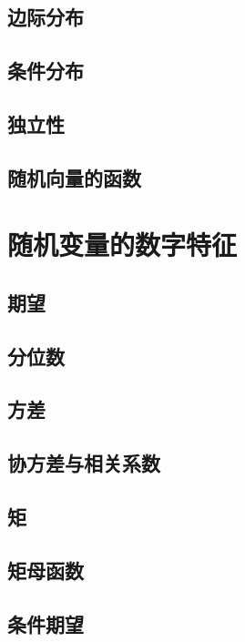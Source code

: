 \documentclass[zihao=-4,linespread=1.5,a4paper,heading=true,oneside]{ctexbook}
\theoremstyle{definition}
\begin{document}
\section{边际分布}\label{sec:3.4}

\section{条件分布}\label{sec:3.5}

\section{独立性}\label{sec:3.6}

\section{随机向量的函数}\label{sec:3.7}


\chapter{随机变量的数字特征}\label{chap:4}
\section{期望}\label{sec:4.1}

\section{分位数}\label{sec:4.2}

\section{方差}\label{sec:4.3}

\section{协方差与相关系数}\label{sec:4.4}

\section{矩}\label{sec:4.5}

\section{矩母函数}\label{sec:4.6}

\section{条件期望}\label{sec:4.7}

\end{document}

